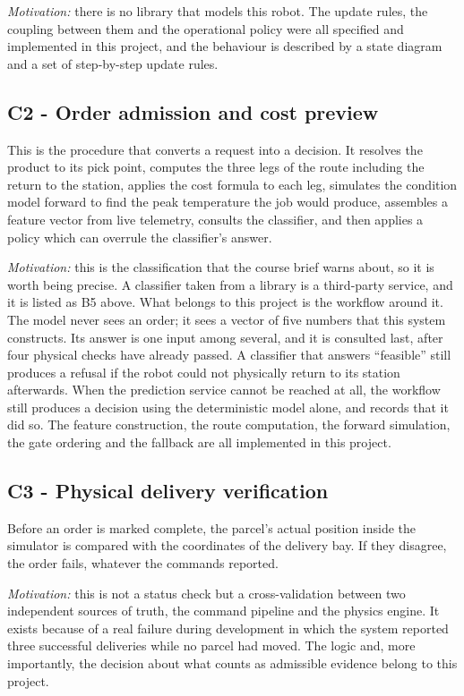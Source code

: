 \documentclass[12pt,a4paper]{report}
\begin{document}
\emph{Motivation:} there is no library that models this robot. The update rules, the coupling
between them and the operational policy were all specified and implemented in this project, and the
behaviour is described by a state diagram and a set of step-by-step update rules.

\subsection*{C2 - Order admission and cost preview}
This is the procedure that converts a request into a decision. It resolves the product to its pick
point, computes the three legs of the route including the return to the station, applies the cost
formula to each leg, simulates the condition model forward to find the peak temperature the job
would produce, assembles a feature vector from live telemetry, consults the classifier, and then
applies a policy which can overrule the classifier's answer.

\emph{Motivation:} this is the classification that the course brief warns about, so it is worth
being precise. A classifier taken from a library is a third-party service, and it is listed as B5
above. What belongs to this project is the workflow around it. The model never sees an order; it
sees a vector of five numbers that this system constructs. Its answer is one input among several,
and it is consulted last, after four physical checks have already passed. A classifier that answers
``feasible'' still produces a refusal if the robot could not physically return to its station
afterwards. When the prediction service cannot be reached at all, the workflow still produces a
decision using the deterministic model alone, and records that it did so. The feature construction,
the route computation, the forward simulation, the gate ordering and the fallback are all
implemented in this project.

\subsection*{C3 - Physical delivery verification}
Before an order is marked complete, the parcel's actual position inside the simulator is compared
with the coordinates of the delivery bay. If they disagree, the order fails, whatever the commands
reported.

\emph{Motivation:} this is not a status check but a cross-validation between two independent
sources of truth, the command pipeline and the physics engine. It exists because of a real failure
during development in which the system reported three successful deliveries while no parcel had
moved. The logic and, more importantly, the decision about what counts as admissible evidence
belong to this project.
\end{document}
